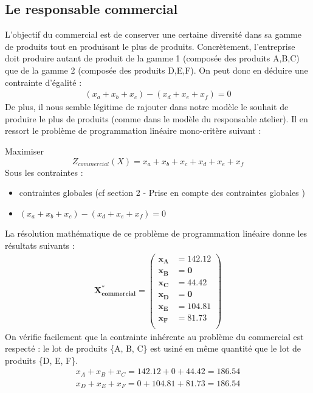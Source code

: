 \documentclass[12pt]{article}
\begin{document}
\subsection{Le responsable commercial}
L'objectif du commercial est de conserver une certaine diversité dans sa gamme de produits tout en produisant le plus de produits. Concrètement, l'entreprise doit produire autant de produit de la gamme 1 (composée des produits A,B,C) que de la gamme 2 (composée des produits D,E,F).
On peut donc en déduire une contrainte d'égalité :
\begin{align*} 
(x_{a} + x_{b} + x_{c}) - (x_{d} + x_{e} + x_{f}) = 0
\end{align*}
De plus, il nous semble légitime de rajouter dans notre modèle le souhait de produire le plus de produits (comme dans le modèle du responsable atelier).
Il en ressort le problème de programmation linéaire mono-critère suivant :
\begin{tcolorbox}
Maximiser
\begin{equation*}
 Z_{commercial}(X)=x_{a} + x_{b} + x_{c} + x_{d} + x_{e} + x_{f}
\end{equation*}
Sous les contraintes :
\begin{itemize}
\item contraintes globales (cf section 2 - Prise en compte des contraintes globales )
\item $(x_{a} + x_{b} + x_{c}) - (x_{d} + x_{e} + x_{f}) = 0$
\end{itemize}
\end{tcolorbox}
La résolution mathématique de ce problème de programmation linéaire donne les résultats suivants :
\begin{align*}
\boldsymbol{X^{*}_{commercial} = 
   \left (
   \begin{aligned}
      x_{A} &= 142.12 \\
      x_{B} &= 0 \\
      x_{C} &= 44.42 \\
      x_{D} &= 0 \\
      x_{E} &= 104.81 \\
      x_{F} &= 81.73 \\
   \end{aligned}
   \right )
 } 
\end{align*}
On vérifie facilement que la contrainte inhérente au problème du commercial est respecté : le lot de produits \{A, B, C\} est usiné en même quantité que le lot de produits \{D, E, F\}. 
\begin{align*}
x_{A} + x_{B} + x_{C} = 142.12 + 0 + 44.42 = 186.54 \\
x_{D} + x_{E} + x_{F} = 0 + 104.81 + 81.73 = 186.54
\end{align*}
\end{document}
